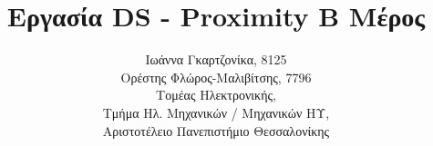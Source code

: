 \usepackage[Greek,Latin]{ucharclasses}

\usepackage{polyglossia}
\setmainlanguage{greek}

\usepackage{fontspec}
\setmainfont[Mapping=tex-text]{DejaVu Sans}
\newfontfamily{}
\newfontfamily{}
\setmonofont[Scale=1.0]{Source Code Pro Medium}
\newfontfamily{}
\usepackage{microtype} %
\title{Εργασία DS - Proximity Β Μέρος}
\author{Ιωάννα Γκαρτζονίκα, 8125\\
Ορέστης Φλώρος-Μαλιβίτσης, 7796\\
  Τομέας Ηλεκτρονικής,\\
  Τμήμα Ηλ. Μηχανικών / Μηχανικών ΗΥ,\\
  Αριστοτέλειο Πανεπιστήμιο Θεσσαλονίκης}

\maketitle
\tableofcontents
\listoffigures
\newpage






%


